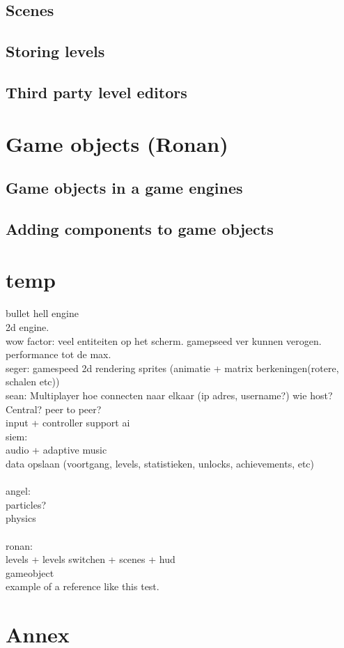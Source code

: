 \documentclass{article} %
\begin{document}
\subsection{Scenes}
\subsection{Storing levels}
\subsection{Third party level editors}

\section{Game objects (Ronan)}
\subsection{Game objects in a game engines}
\subsection{Adding components to game objects}

\newpage

\section{temp}
bullet hell engine
\\
2d engine.
\\
wow factor: veel entiteiten op het scherm. gamepseed ver kunnen verogen.
performance tot de max.
\\
seger:
gamespeed
2d rendering
sprites (animatie + matrix berkeningen(rotere, schalen etc))
\\
sean:
Multiplayer
hoe connecten naar elkaar (ip adres, username?)
wie host? Central? peer to peer?
\\
input + controller support
ai
\\
siem:\\
audio + adaptive music\\
data opslaan (voortgang, levels, statistieken, unlocks, achievements, etc)\\
\\
angel:\\
particles?\\
physics\\
\\
ronan:\\
levels + levels switchen + scenes + hud \\
gameobject
\\

example of a reference \cite{Gambetta_2024} like this test.


\newpage

\section{Annex}
\begin{otherlanguage}{australian}
	\printbibliography
\end{otherlanguage}
\end{document}

